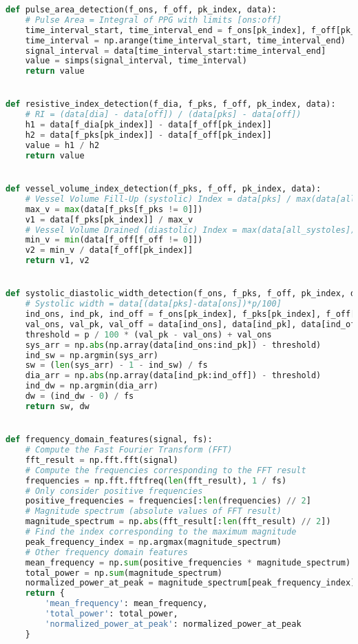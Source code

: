 \begin{lstlisting}[language=Python,label={lst:fe.py}, basicstyle=\scriptsize]
def pulse_area_detection(f_ons, f_off, pk_index, data):
    # Pulse Area = Integral of PPG with limits [ons:off]
    time_interval_start, time_interval_end = f_ons[pk_index], f_off[pk_index]
    time_interval = np.arange(time_interval_start, time_interval_end)
    signal_interval = data[time_interval_start:time_interval_end]
    value = simps(signal_interval, time_interval)
    return value


def resistive_index_detection(f_dia, f_pks, f_off, pk_index, data):
    # RI = (data[dia] - data[off]) / (data[pks] - data[off])
    h1 = data[f_dia[pk_index]] - data[f_off[pk_index]]
    h2 = data[f_pks[pk_index]] - data[f_off[pk_index]]
    value = h1 / h2
    return value


def vessel_volume_index_detection(f_pks, f_off, pk_index, data):
    # Vessel Volume Fill-Up (systolic) Index = data[pks] / max(data[all_systoles])
    max_v = max(data[f_pks[f_pks != 0]])
    v1 = data[f_pks[pk_index]] / max_v
    # Vessel Volume Drained (diastolic) Index = max(data[all_systoles]) / data[off]
    min_v = min(data[f_off[f_off != 0]])
    v2 = min_v / data[f_off[pk_index]]
    return v1, v2


def systolic_diastolic_width_detection(f_ons, f_pks, f_off, pk_index, data, fs, p):
    # Systolic width = data[(data[pks]-data[ons])*p/100]
    ind_ons, ind_pk, ind_off = f_ons[pk_index], f_pks[pk_index], f_off[pk_index]
    val_ons, val_pk, val_off = data[ind_ons], data[ind_pk], data[ind_off]
    threshold = p / 100 * (val_pk - val_ons) + val_ons
    sys_arr = np.abs(np.array(data[ind_ons:ind_pk]) - threshold)
    ind_sw = np.argmin(sys_arr)
    sw = (len(sys_arr) - 1 - ind_sw) / fs
    dia_arr = np.abs(np.array(data[ind_pk:ind_off]) - threshold)
    ind_dw = np.argmin(dia_arr)
    dw = (ind_dw - 0) / fs
    return sw, dw


def frequency_domain_features(signal, fs):
    # Compute the Fast Fourier Transform (FFT)
    fft_result = np.fft.fft(signal)
    # Compute the frequencies corresponding to the FFT result
    frequencies = np.fft.fftfreq(len(fft_result), 1 / fs)
    # Only consider positive frequencies
    positive_frequencies = frequencies[:len(frequencies) // 2]
    # Magnitude spectrum (absolute values of FFT result)
    magnitude_spectrum = np.abs(fft_result[:len(fft_result) // 2])
    # Find the index corresponding to the maximum magnitude
    peak_frequency_index = np.argmax(magnitude_spectrum)
    # Other frequency domain features
    mean_frequency = np.sum(positive_frequencies * magnitude_spectrum) / np.sum(magnitude_spectrum)
    total_power = np.sum(magnitude_spectrum)
    normalized_power_at_peak = magnitude_spectrum[peak_frequency_index] / total_power
    return {
        'mean_frequency': mean_frequency,
        'total_power': total_power,
        'normalized_power_at_peak': normalized_power_at_peak
    }
\end{lstlisting}

